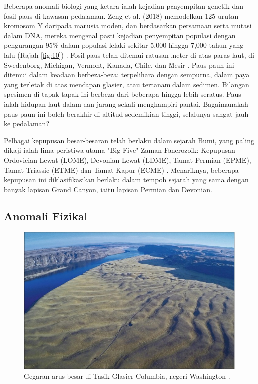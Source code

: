 \documentclass[10pt,twocolumn,letterpaper]{article}
\begin{document}
Beberapa anomali biologi yang ketara ialah kejadian penyempitan genetik dan fosil paus di kawasan pedalaman. Zeng et al. (2018) memodelkan 125 urutan kromosom Y daripada manusia moden, dan berdasarkan persamaan serta mutasi dalam DNA, mereka mengenal pasti kejadian penyempitan populasi dengan pengurangan 95\% dalam populasi lelaki sekitar 5,000 hingga 7,000 tahun yang lalu (Rajah \ref{fig:10}) \cite{62}. Fosil paus telah ditemui ratusan meter di atas paras laut, di Swedenborg, Michigan, Vermont, Kanada, Chile, dan Mesir \cite{63,64,65,66}. Paus-paun ini ditemui dalam keadaan berbeza-beza: terpelihara dengan sempurna, dalam paya yang terletak di atas mendapan glasier, atau tertanam dalam sedimen. Bilangan spesimen di tapak-tapak ini berbeza dari beberapa hingga lebih seratus. Paus ialah hidupan laut dalam dan jarang sekali menghampiri pantai. Bagaimanakah paus-paun ini boleh berakhir di altitud sedemikian tinggi, selalunya sangat jauh ke pedalaman?

Pelbagai kepupusan besar-besaran telah berlaku dalam sejarah Bumi, yang paling dikaji ialah lima peristiwa utama "Big Five" Zaman Fanerozoik: Kepupusan Ordovician Lewat (LOME), Devonian Lewat (LDME), Tamat Permian (EPME), Tamat Triassic (ETME) dan Tamat Kapur (ECME) \cite{88,89}. Menariknya, beberapa kepupusan ini diklasifikasikan berlaku dalam tempoh sejarah yang sama dengan banyak lapisan Grand Canyon, iaitu lapisan Permian dan Devonian.

\subsection{Anomali Fizikal}

\begin{figure}[b]
\begin{center}
   \includegraphics[width=1\linewidth]{columbia.jpg}
\end{center}
   \caption{Gegaran arus besar di Tasik Glasier Columbia, negeri Washington \cite{80}.}
\label{fig:11}
\label{fig:onecol}
\end{figure}
\end{document}
